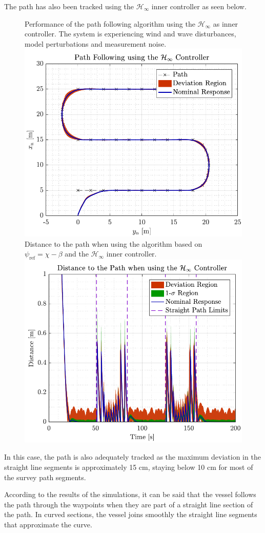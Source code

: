 The path has also been tracked using the $\mathcal{H}_\infty$ inner controller as seen below.
\begin{figure}[H]
    \captionbox 
    {   
        Performance of the path following algorithm using the $\mathcal{H}_\infty$ as inner controller. The system is experiencing wind and wave disturbances, model perturbations and measurement noise. \label{fig:path_rob2}
    }                                                                 
    {                                                                  
        \includegraphics[width=.45\textwidth]{figures/path_rob}         
    }                                                                    
    \hspace{5pt}                                                          
    \captionbox  
    {      
        Distance to the path when using the algorithm based on $\psi_\mathrm{ref}=\chi-\beta$ and the $\mathcal{H}_\infty$ inner controller. \label{fig:dist_rob2}
    }                                                                          
    {
        \includegraphics[width=.45\textwidth]{figures/dist_rob}
    }
\end{figure}
In this case, the path is also adequately tracked as the maximum deviation in the straight line segments is approximately 15 cm, staying below 10 cm for most of the survey path segments.

According to the results of the simulations, it can be said that the vessel follows the path through the waypoints when they are part of a straight line section of the path. In curved sections, the vessel joins smoothly the straight line segments that approximate the curve. 

